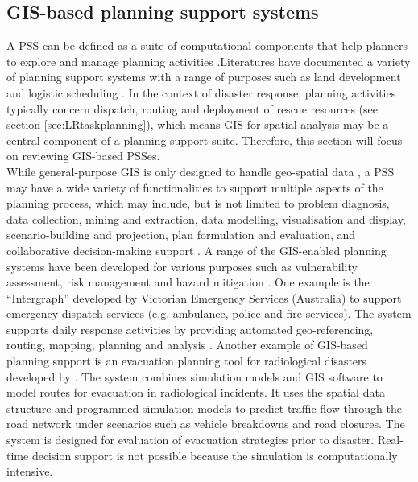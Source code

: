 \subsection{GIS-based planning support systems}
A \acf{PSS} can be defined as a suite of computational components that help planners to explore and manage planning activities \citep{Geertman2004}.Literatures have documented a variety of planning support systems with a range of purposes such as land development \citep{Pettit2003}  and logistic scheduling \citep{Miller}. In the context of disaster response, planning activities  typically concern dispatch, routing and deployment of rescue resources (see section \ref{sec:LRtaskplanning}), which means \ac{GIS} for spatial analysis may be a central component of a planning support suite. Therefore, this section will focus on reviewing \ac{GIS}-based \ac{PSS}es. \\

While general-purpose \ac{GIS} is only designed to handle geo-spatial data \citep{Geertman2004}, a \ac{PSS} may have a wide variety of functionalities to support multiple aspects of the planning process, which may include, but is not limited to problem diagnosis, data collection, mining and extraction, data modelling, visualisation and display, scenario-building and projection, plan formulation and evaluation, and collaborative decision-making support \citep{Geertman2004,Zerger2003}. A range of the \ac{GIS}-enabled planning systems have been developed for various purposes such as vulnerability assessment, risk management and hazard mitigation \citep{Cova1999,Schooley2010}. One example is the ``Intergraph'' developed by Victorian Emergency Services (Australia) \citep{IntergraphCorporation2000} to support emergency dispatch services (e.g. ambulance, police and fire services). The system supports daily response activities by providing automated geo-referencing, routing, mapping, planning and analysis \citep{Zerger2003}. Another example of \ac{GIS}-based planning support is an evacuation planning tool for radiological disasters developed by \citep{Eglese1994}. The system combines simulation models and  \ac{GIS} software to model routes for evacuation in radiological incidents.  It uses the spatial data structure and programmed simulation models to predict traffic flow through the road network under scenarios such as vehicle breakdowns and road closures. The system is designed for evaluation of evacuation strategies prior to disaster. Real-time decision support is not possible because the simulation is computationally intensive.\\

